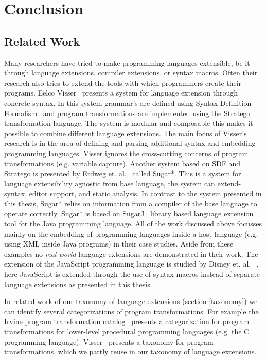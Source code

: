 
\chapter{Conclusion} %

\label{Chapter5} 


\section{Related Work}
Many researchers have tried to make programming languages extensible, be it through language extensions, compiler extensions, or syntax macros. Often their research also tries to extend the tools with which programmers create their programs. Eelco Visser~\cite{Visser20024} presents a system for language extension through concrete syntax. In this system grammar's are defined using Syntax Definition Formalism~\cite{Heering1989} and program transformations are implemented using the Stratego~\cite{Visser2001a} transformation language. The system is modular and composable this makes it possible to combine different language extensions. The main focus of Visser's research is in the area of defining and parsing additional syntax and embedding programming languages. Visser ignores the cross-cutting concerns of program transformations (e.g. variable capture). Another system based on SDF and Stratego is presented by Erdweg et. al.~\cite{Erdweg} called Sugar*. This is a system for language extensibility agnostic from base language, the system can extend- syntax, editor support, and static analysis. In contrast to the system presented in this thesis, Sugar* relies on information from a compiler of the base language to operate correctly. Sugar* is based on SugarJ~\cite{Erdweg2011} library based language extension tool for the Java programming language.  All of the work discussed above focusses mainly on the embedding of programming languages inside a host language (e.g. using XML inside Java programs) in their case studies. Aside from these examples no \textit{real-world} language extensions are demonstrated in their work. The extension of the JavaScript programming language is studied by Disney et. al. ~\cite{Disney2014}, here JavaScript is extended through the use of syntax macros instead of separate language extensions as presented in this thesis.

In related work of our taxonomy of language extensions (section \ref{taxonomy}) we can identify several categorizations of program transformations. For example the Irvine program transformation catalog~\cite{Standish1976a} presents a categorization for program transformations for lower-level procedural programming languages (e.g. the C programming language). Visser~\cite{Visser2001} presents a taxonomy for program transformations, which we partly reuse in our taxonomy of language extensions. 


